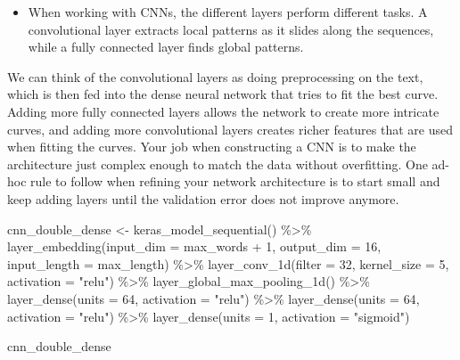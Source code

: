 \documentclass[
]{krantz}
\makeatletter
\newenvironment{Shaded}{\begin{snugshade}}{\end{snugshade}}
\newcommand{\AttributeTok}[1]{\textcolor[rgb]{0.77,0.63,0.00}{#1}}
\newcommand{\DecValTok}[1]{\textcolor[rgb]{0.00,0.00,0.81}{#1}}
\newcommand{\FunctionTok}[1]{\textcolor[rgb]{0.00,0.00,0.00}{#1}}
\newcommand{\NormalTok}[1]{#1}
\newcommand{\OtherTok}[1]{\textcolor[rgb]{0.56,0.35,0.01}{#1}}
\newcommand{\SpecialCharTok}[1]{\textcolor[rgb]{0.00,0.00,0.00}{#1}}
\newcommand{\StringTok}[1]{\textcolor[rgb]{0.31,0.60,0.02}{#1}}
\newenvironment{kframe}{%
\medskip{}
\setlength{\fboxsep}{.8em}
 \def\at@end@of@kframe{}%
 \ifinner\ifhmode%
  \def\at@end@of@kframe{\end{minipage}}%
  \begin{minipage}{\columnwidth}%
 \fi\fi%
 \def\FrameCommand##1{\hskip\@totalleftmargin \hskip-\fboxsep
 \colorbox{shadecolor}{##1}\hskip-\fboxsep
     \hskip-\linewidth \hskip-\@totalleftmargin \hskip\columnwidth}%
 \MakeFramed {\advance\hsize-\width
   \@totalleftmargin\z@ \linewidth\hsize
   \@setminipage}}%
 {\par\unskip\endMakeFramed%
 \at@end@of@kframe}
\renewenvironment{Shaded}{\begin{kframe}}{\end{kframe}}
\newenvironment{rmdblock}[1]
  {\begin{shaded*}
  \begin{itemize}[left = -1cm, labelsep = 1cm]
  \renewcommand{\labelitemi}{
    \raisebox{-.7\height}[0pt][0pt]{
      {\setkeys{Gin}{width=3em,keepaspectratio}\texttt{[image: images/\#1]}}
    }
  }
 
  \item
  }
  {
  \end{itemize}
  \end{shaded*}
  }
\newenvironment{rmdwarning}
  {\begin{rmdblock}{warning}}
  {\end{rmdblock}}
\makeatother
\begin{document}
\begin{rmdwarning}
When working with CNNs, the different layers perform different tasks. A
convolutional layer extracts local patterns as it slides along the
sequences, while a fully connected layer finds global patterns.
\end{rmdwarning}

We can think of the convolutional layers as doing preprocessing on the text, which is then fed into the dense neural network that tries to fit the best curve. Adding more fully connected layers allows the network to create more intricate curves, and adding more convolutional layers creates richer features that are used when fitting the curves. Your job when constructing a CNN is to make the architecture just complex enough to match the data without overfitting. One ad-hoc rule to follow when refining your network architecture is to start small and keep adding layers until the validation error does not improve anymore.

\begin{Shaded}
\begin{Highlighting}[]
\NormalTok{cnn\_double\_dense }\OtherTok{\textless{}{-}} \FunctionTok{keras\_model\_sequential}\NormalTok{() }\SpecialCharTok{\%\textgreater{}\%}
  \FunctionTok{layer\_embedding}\NormalTok{(}\AttributeTok{input\_dim =}\NormalTok{ max\_words }\SpecialCharTok{+} \DecValTok{1}\NormalTok{, }\AttributeTok{output\_dim =} \DecValTok{16}\NormalTok{,}
                  \AttributeTok{input\_length =}\NormalTok{ max\_length) }\SpecialCharTok{\%\textgreater{}\%}
  \FunctionTok{layer\_conv\_1d}\NormalTok{(}\AttributeTok{filter =} \DecValTok{32}\NormalTok{, }\AttributeTok{kernel\_size =} \DecValTok{5}\NormalTok{, }\AttributeTok{activation =} \StringTok{"relu"}\NormalTok{) }\SpecialCharTok{\%\textgreater{}\%}
  \FunctionTok{layer\_global\_max\_pooling\_1d}\NormalTok{() }\SpecialCharTok{\%\textgreater{}\%}
  \FunctionTok{layer\_dense}\NormalTok{(}\AttributeTok{units =} \DecValTok{64}\NormalTok{, }\AttributeTok{activation =} \StringTok{"relu"}\NormalTok{) }\SpecialCharTok{\%\textgreater{}\%}
  \FunctionTok{layer\_dense}\NormalTok{(}\AttributeTok{units =} \DecValTok{64}\NormalTok{, }\AttributeTok{activation =} \StringTok{"relu"}\NormalTok{) }\SpecialCharTok{\%\textgreater{}\%}
  \FunctionTok{layer\_dense}\NormalTok{(}\AttributeTok{units =} \DecValTok{1}\NormalTok{, }\AttributeTok{activation =} \StringTok{"sigmoid"}\NormalTok{)}

\NormalTok{cnn\_double\_dense}
\end{Highlighting}
\end{Shaded}
\end{document}
